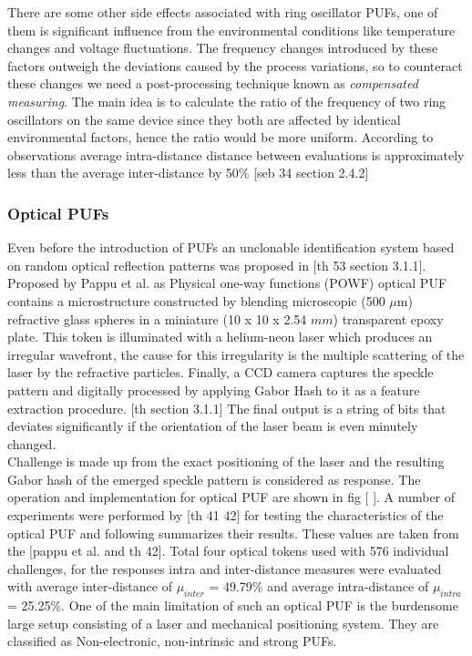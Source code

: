 There are some other side effects associated with ring oscillator PUFs, one of them is significant influence from the environmental conditions like temperature changes and voltage fluctuations. The frequency changes introduced by these factors outweigh the deviations caused by the process variations, so to counteract these changes we need a post-processing technique known as \emph{compensated measuring}. The main idea is to calculate the ratio of the frequency of two ring oscillators
on the same device since they both are affected by identical environmental factors, hence the ratio would be more uniform. According to observations average intra-distance distance between evaluations is approximately less than the average inter-distance by 50\% [seb 34 section 2.4.2]

\subsubsection{Optical PUFs}

Even before the introduction of PUFs an unclonable identification system based on random optical reflection patterns was proposed in [th 53 section 3.1.1]. Proposed by Pappu et al. as Physical one-way functions (POWF) optical PUF contains a microstructure constructed by blending microscopic (500 $\mu$m) refractive glass spheres in a miniature (10 x 10 x 2.54 $mm$) transparent epoxy plate. This token is illuminated with a helium-neon laser which produces an irregular wavefront,
the cause for this irregularity is the multiple scattering of the laser by the refractive particles. Finally, a CCD camera captures the speckle pattern and digitally processed by applying Gabor Hash to it as a feature extraction procedure. [th section 3.1.1] The final output is a string of bits that deviates significantly if the orientation of the laser beam is even minutely changed.\\

Challenge is made up from the exact positioning of the laser and the resulting Gabor hash of the emerged speckle pattern is considered as response. The operation and implementation for optical PUF are shown in fig [ ]. A number of experiments were performed by [th 41 42] for testing the characteristics of the optical PUF and following summarizes their results. These values are taken from the [pappu et al. and th 42]. Total four optical tokens used with 576 individual challenges, for the
responses intra and inter-distance measures were evaluated with average inter-distance of $\mu_{inter}$ = 49.79\% and average intra-distance of
$\mu_{intra}$ = 25.25\%. One of the main limitation of such an optical PUF is the burdensome large setup consisting of a laser and mechanical positioning system. They are classified as Non-electronic, non-intrinsic and strong PUFs.\\

